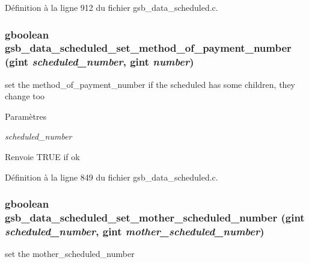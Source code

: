 Définition à la ligne 912 du fichier gsb\_\-data\_\-scheduled.c.

\subsubsection[{gsb\_\-data\_\-scheduled\_\-set\_\-method\_\-of\_\-payment\_\-number}]{\setlength{\rightskip}{0pt plus 5cm}gboolean gsb\_\-data\_\-scheduled\_\-set\_\-method\_\-of\_\-payment\_\-number (gint {\em scheduled\_\-number}, \/  gint {\em number})}\label{gsb__data__scheduled_8c_a8ab4146a9644d811614d40761cffb8ff}
set the method\_\-of\_\-payment\_\-number if the scheduled has some children, they change too


\begin{DoxyParams}{Paramètres}
\item[{\em scheduled\_\-number}]\item[{\em }]\end{DoxyParams}
\begin{DoxyReturn}{Renvoie}
TRUE if ok 
\end{DoxyReturn}


Définition à la ligne 849 du fichier gsb\_\-data\_\-scheduled.c.

\subsubsection[{gsb\_\-data\_\-scheduled\_\-set\_\-mother\_\-scheduled\_\-number}]{\setlength{\rightskip}{0pt plus 5cm}gboolean gsb\_\-data\_\-scheduled\_\-set\_\-mother\_\-scheduled\_\-number (gint {\em scheduled\_\-number}, \/  gint {\em mother\_\-scheduled\_\-number})}\label{gsb__data__scheduled_8c_a81e177057b8cee058231df2a82c98800}
set the mother\_\-scheduled\_\-number


